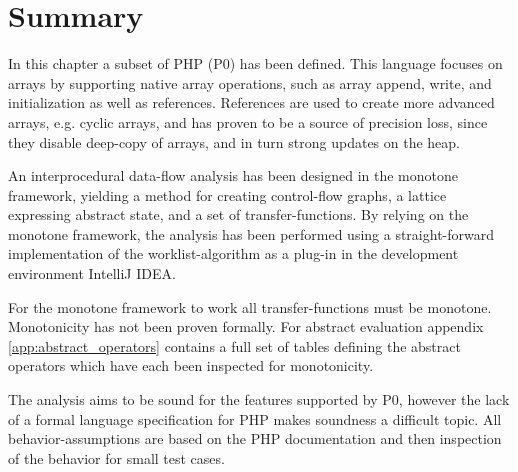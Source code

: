 \section{Summary}

In this chapter a subset of PHP (P0) has been defined. This language focuses on arrays by supporting native array operations, such as array append, write, and initialization as well as references. %
References are used to create more advanced arrays, e.g. cyclic arrays, and has proven to be a source of precision loss, since they disable deep-copy of arrays, and in turn strong updates on the heap. 

An interprocedural data-flow analysis has been designed in the monotone framework, yielding a method for creating control-flow graphs, a lattice expressing abstract state, and a set of transfer-functions. By relying on the monotone framework, the analysis has been performed using a straight-forward implementation of the worklist-algorithm as a plug-in in the development environment IntelliJ IDEA. 

For the monotone framework to work all transfer-functions must be monotone. Monotonicity has not been proven formally. For abstract evaluation appendix \ref{app:abstract_operators} contains a full set of tables defining the abstract operators which have each been inspected for monotonicity.

The analysis aims to be sound for the features supported by P0, however the lack of a formal language specification for PHP makes soundness a difficult topic. All behavior-assumptions are based on the PHP documentation and then inspection of the behavior for small test cases.